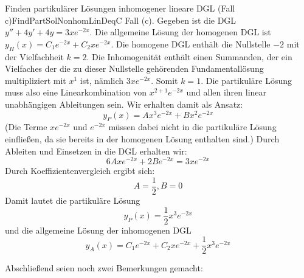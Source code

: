 \begin{example}{Finden partikulärer Lösungen inhomogener lineare DGL (Fall c)}{FindPartSolNonhomLinDeqC}
    Fall (c). Gegeben ist die DGL $y''+4y'+4y=3xe^{-2x}$. Die allgemeine Lösung der homogenen DGL ist $y_H(x) = C_1 e^{-2x} + C_2 x e^{-2x}$. Die homogene DGL enthält die Nullstelle $-2$ mit der Vielfachheit $k=2$. Die Inhomogenität enthält einen Summanden, der ein Vielfaches der die zu dieser Nullstelle gehörenden Fundamentallösung multipliziert mit $x^1$ ist, nämlich $3xe^{-2x}$. Somit $k=1$. Die partikuläre Lösung muss also eine Linearkombination von $x^{2+1} e^{-2x}$ und allen ihren linear unabhängigen Ableitungen sein. Wir erhalten damit als Ansatz:
    $$
        y_P(x) = Ax^3e^{-2x}+Bx^2 e^{-2x}
    $$
    (Die Terme $xe^{-2x}$ und $e^{-2x}$ müssen dabei nicht in die partikuläre Lösung einfließen, da sie bereits in der homogenen Lösung enthalten sind.) Durch Ableiten und Einsetzen in die DGL erhalten wir:
    $$
      6Axe^{-2x}  + 2B{e^{-2x}} = 3xe^{-2x}
    $$
    Durch Koeffizientenvergleich ergibt sich:
    $$
        A = \frac{1}{2}, B=0
    $$
    Damit lautet die partikuläre Lösung
    $$
        y_P(x) = \frac{1}{2}x^3e^{-2x}
    $$
    und die allgemeine Lösung der inhomogenen DGL
    $$
        y_A(x) = C_1 e^{-2x} + C_2 x e^{-2x} + \frac{1}{2}x^3e^{-2x}
    $$
\end{example}

Abschließend seien noch zwei Bemerkungen gemacht:

